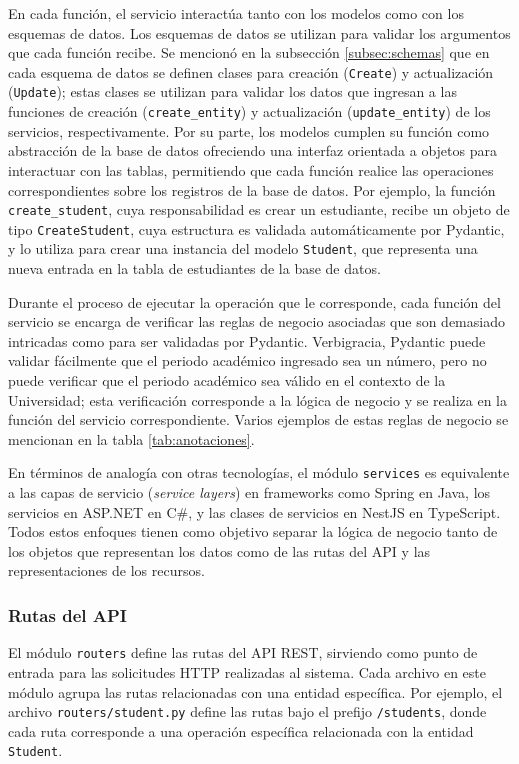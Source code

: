En cada función, el servicio interactúa tanto con los modelos como con los esquemas de datos. Los esquemas de datos se utilizan para validar los argumentos que cada función recibe. Se mencionó en la subsección \ref{subsec:schemas} que en cada esquema de datos se definen clases para creación (\texttt{Create}) y actualización (\texttt{Update}); estas clases se utilizan para validar los datos que ingresan a las funciones de creación (\texttt{create\_entity}) y actualización (\texttt{update\_entity}) de los servicios, respectivamente. Por su parte, los modelos cumplen su función como abstracción de la base de datos ofreciendo una interfaz orientada a objetos para interactuar con las tablas, permitiendo que cada función realice las operaciones correspondientes sobre los registros de la base de datos. Por ejemplo, la función \texttt{create\_student}, cuya responsabilidad es crear un estudiante, recibe un objeto de tipo \texttt{CreateStudent}, cuya estructura es validada automáticamente por \gls{Pydantic}, y lo utiliza para crear una instancia del modelo \texttt{Student}, que representa una nueva entrada en la tabla de estudiantes de la base de datos.

Durante el proceso de ejecutar la operación que le corresponde, cada función del servicio se encarga de verificar las reglas de negocio asociadas que son demasiado intricadas como para ser validadas por \gls{Pydantic}. Verbigracia, \gls{Pydantic} puede validar fácilmente que el periodo académico ingresado sea un número, pero no puede verificar que el periodo académico sea válido en el contexto de la Universidad; esta verificación corresponde a la lógica de negocio y se realiza en la función del servicio correspondiente. Varios ejemplos de estas reglas de negocio se mencionan en la tabla \ref{tab:anotaciones}.

En términos de analogía con otras tecnologías, el módulo \texttt{services} es equivalente a las capas de servicio (\textit{service layers}) en frameworks como Spring en Java, los servicios en ASP.NET en C\#, y las clases de servicios en NestJS en TypeScript. Todos estos enfoques tienen como objetivo separar la lógica de negocio tanto de los objetos que representan los datos como de las rutas del API y las representaciones de los recursos.

\subsubsection{Rutas del API}
El módulo \texttt{routers} define las rutas del \gls{API REST}, sirviendo como punto de entrada para las solicitudes \gls{HTTP} realizadas al sistema. Cada archivo en este módulo agrupa las rutas relacionadas con una entidad específica. Por ejemplo, el archivo \texttt{routers/student.py} define las rutas bajo el prefijo \texttt{/students}, donde cada ruta corresponde a una operación específica relacionada con la entidad \texttt{Student}.

